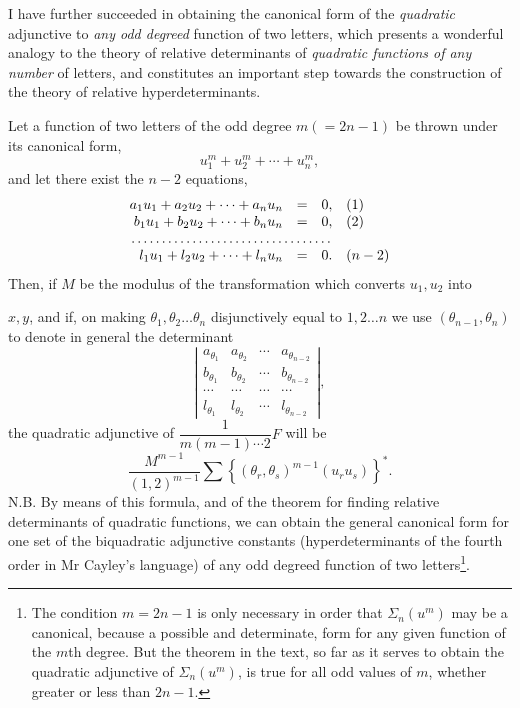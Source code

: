 \documentclass[11pt]{article}
\newcommand{\sourcepage}[1]{\marginpar{\scriptsize p.~#1}}
\begin{document}
{{I have further succeeded in obtaining the canonical form of the \emph{quadratic} adjunctive to \emph{any odd degreed} function of two letters, which presents a wonderful analogy to the theory of relative determinants of \emph{quadratic functions of any number} of letters, and constitutes an important step towards the construction of the theory of relative hyperdeterminants.

Let a function of two letters of the odd degree $m(=2n-1)$ be thrown under its canonical form,
\[
 u_1^m+u_2^m+\cdots+u_n^m,
\]
and let there exist the $n-2$ equations,
\[
\begin{array}{rcll}
a_1u_1+a_2u_2+\cdots+a_nu_n&=&0, &(1)\\
b_1u_1+b_2u_2+\cdots+b_nu_n&=&0, &(2)\\
\multicolumn{3}{c}{\dotfill}\\
l_1u_1+l_2u_2+\cdots+l_nu_n&=&0. &(n-2)
\end{array}
\]
Then, if $M$ be the modulus of the transformation which converts $u_1,u_2$ into

\sourcepage{207}
$x,y$, and if, on making $\theta_1,\theta_2\ldots\theta_n$ disjunctively equal to $1,2\ldots n$ we use $(\theta_{n-1},\theta_n)$ to denote in general the determinant
\[
\left|
\begin{array}{cccc}
a_{\theta_1}&a_{\theta_2}&\cdots&a_{\theta_{n-2}}\\
b_{\theta_1}&b_{\theta_2}&\cdots&b_{\theta_{n-2}}\\
\cdots&\cdots&\cdots&\cdots\\
l_{\theta_1}&l_{\theta_2}&\cdots&l_{\theta_{n-2}}
\end{array}
\right|,
\]
the quadratic adjunctive of $\dfrac{1}{m(m-1)\cdots2}F$ will be
\[
 \frac{M^{m-1}}{(1,2)^{m-1}}
 \sum\left\{(\theta_r,\theta_s)^{m-1}(u_r u_s)\right\}^* .
\]
N.B. By means of this formula, and of the theorem for finding relative determinants of quadratic functions, we can obtain the general canonical form for one set of the biquadratic adjunctive constants (hyperdeterminants of the fourth order in Mr Cayley's language) of any odd degreed function of two letters\footnote{The condition $m=2n-1$ is only necessary in order that $\Sigma_n(u^m)$ may be a canonical, because a possible and determinate, form for any given function of the $m$th degree. But the theorem in the text, so far as it serves to obtain the quadratic adjunctive of $\Sigma_n(u^m)$, is true for all odd values of $m$, whether greater or less than $2n-1$.}.

}}
\end{document}
